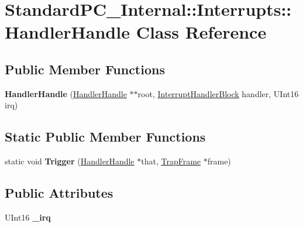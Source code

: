 \hypertarget{class_standard_p_c___internal_1_1_interrupts_1_1_handler_handle}{}\section{Standard\+P\+C\+\_\+\+Internal\+:\+:Interrupts\+:\+:Handler\+Handle Class Reference}
\label{class_standard_p_c___internal_1_1_interrupts_1_1_handler_handle}
\subsection*{Public Member Functions}
\begin{DoxyCompactItemize}
\item 
\mbox{\label{class_standard_p_c___internal_1_1_interrupts_1_1_handler_handle_aa0cd42d3b76365eec1915c1d5b85e67e}} 
{\bfseries Handler\+Handle} (\hyperlink{class_standard_p_c___internal_1_1_interrupts_1_1_handler_handle}{Handler\+Handle} $\ast$$\ast$root, \hyperlink{classbicycle_1_1function}{Interrupt\+Handler\+Block} handler, U\+Int16 irq)
\end{DoxyCompactItemize}
\subsection*{Static Public Member Functions}
\begin{DoxyCompactItemize}
\item 
\mbox{\label{class_standard_p_c___internal_1_1_interrupts_1_1_handler_handle_a4356b689bebad58bb05ba5e5f90d6d4c}} 
static void {\bfseries Trigger} (\hyperlink{class_standard_p_c___internal_1_1_interrupts_1_1_handler_handle}{Handler\+Handle} $\ast$that, \hyperlink{struct_trap_frame}{Trap\+Frame} $\ast$frame)
\end{DoxyCompactItemize}
\subsection*{Public Attributes}
\begin{DoxyCompactItemize}
\item 
\mbox{\label{class_standard_p_c___internal_1_1_interrupts_1_1_handler_handle_a72a595706d8182774873d0d4394de817}} 
U\+Int16 {\bfseries \+\_\+irq}
\end{DoxyCompactItemize}
